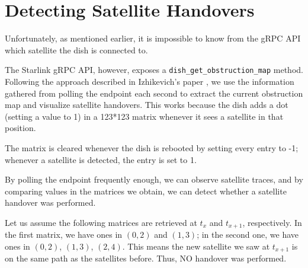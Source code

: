 \documentclass[IN,11pt,twoside,openright,idp,english]{tumthesis}
\begin{document}
\section{Detecting Satellite Handovers}

Unfortunately, as mentioned earlier, it is impossible to know from the gRPC API which satellite the dish is connected to.

The Starlink gRPC API, however, exposes a \texttt{dish\_get\_obstruction\_map} method. Following the approach described
in Izhikevich's paper \cite{izhikevich2023democratizing}, we use the information gathered from polling the endpoint each
second to extract the current obstruction map and visualize satellite handovers. This works because the dish adds a dot
(setting a value to 1) in a 123*123 matrix whenever it sees a satellite in that position. 

The matrix is cleared whenever the dish is rebooted by setting every entry to -1; whenever a satellite is detected, the
entry is set to 1. 

By polling the endpoint frequently enough, we can observe satellite traces, and by comparing values in the matrices we
obtain, we can detect whether a satellite handover was performed.

Let us assume the following matrices are retrieved at $ t_x $ and $ t_{x+1} $, respectively. 
In the first matrix, we have ones in $ (0,2) $ and $ (1,3) $; in the second one, we have ones in $ (0,2) $, $ (1,3) $, $
(2,4) $. This means the new satellite we saw at $ t_{x+1} $ is on the same path as the satellites before. Thus, NO
handover was performed. \vspace{10mm}
\end{document}

